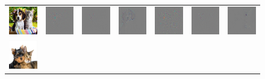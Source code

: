 \begin{figure}
\begin{center}
\begin{tabular}{ccccccc}
\vspace{-2.5pt}
\includegraphics[width=0.14\linewidth,height=0.115\linewidth]{figs/examples/googlenet/oxford/dog-cat2} &
\includegraphics[width=0.14\linewidth,height=0.115\linewidth]{figs/examples/googlenet/oxford/dog-cat2_diff_163} &
\includegraphics[width=0.14\linewidth,height=0.115\linewidth]{figs/examples/googlenet/deconv/dog-cat2_diff_163} &
\includegraphics[width=0.14\linewidth,height=0.115\linewidth]{figs/examples/googlenet/soft/dog-cat2_diff_163} &
\includegraphics[width=0.14\linewidth,height=0.115\linewidth]{figs/examples/googlenet/oxford/dog-cat2_diff_286} &
\includegraphics[width=0.14\linewidth,height=0.115\linewidth]{figs/examples/googlenet/deconv/dog-cat2_diff_286} &
\includegraphics[width=0.14\linewidth,height=0.115\linewidth]{figs/examples/googlenet/soft/dog-cat2_diff_286} \\
\vspace{-2.5pt}
\includegraphics[width=0.14\linewidth,height=0.115\linewidth]{figs/examples/googlenet/oxford/dog-cat3} &

\end{tabular}
\end{center}
\end{figure}
